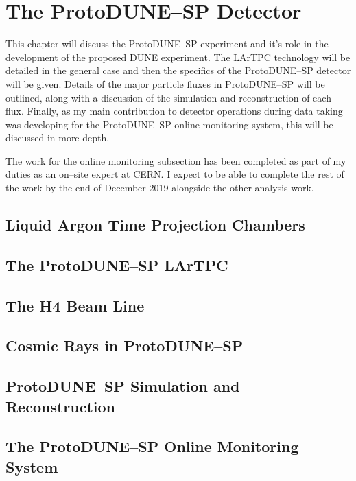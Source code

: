 \chapter{\label{ch:3-protodune}The ProtoDUNE--SP Detector} 


This chapter will discuss the ProtoDUNE--SP experiment and it's role in the
development of the proposed DUNE experiment. The LArTPC technology will be
detailed in the general case and then the specifics of the ProtoDUNE--SP
detector will be given. Details of the major particle fluxes in ProtoDUNE--SP
will be outlined, along with a discussion of the simulation and reconstruction
of each flux. Finally, as my main contribution to detector operations during
data taking was developing for the ProtoDUNE--SP online monitoring system, this
will be discussed in more depth. 

The work for the online monitoring subsection has been completed as part of my
duties as an on--site expert at CERN. I expect to be able to complete the rest
of the work by the end of December 2019 alongside the other analysis work.

\section{Liquid Argon Time Projection Chambers}
\section{The ProtoDUNE--SP LArTPC}
\section{The H4 Beam Line}
\section{Cosmic Rays in ProtoDUNE--SP}
\section{ProtoDUNE--SP Simulation and Reconstruction}
\section{The ProtoDUNE--SP Online Monitoring System}
